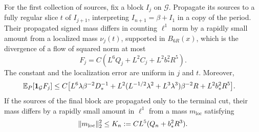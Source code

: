 \begin{lemma}\label{lem:blockflow}
For the first collection of sources, fix a block \(I_j\) on
\(\mathcal G\).  Propagate its sources to a fully regular slice \(t\)
of \(I_{j+1}\), interpreting \(I_{n+1}=\beta+I_1\) in a copy of the
period.  Their propagated signed mass differs in counting
\(\ell^1\) norm by a rapidly small amount from a localized mass
\(\nu_j(t)\), supported in \(B_{6R}(x)\), which is the divergence
of a flow of squared norm at most
\begin{equation}\label{eq:blockflowbound}
 F_j=C\left(L^6Q_j+L^2C_j+L^2b_*^2R^5\right).
\end{equation}
The constant and the localization error are uniform in \(j\) and
\(t\).  Moreover,
\begin{align}\label{eq:blockflowexpectation}
 \mathbb E_P[\mathbf 1_{\mathcal G}F_j]
 \le C\bigl[&L^6\lambda\beta^{-2}D_*^{-1}
 +L^2(L^{-1/2}\lambda^2+L^3\lambda^3)\beta^{-2}R
 +L^2b_*^2R^5\bigr].
\end{align}
If the sources of the final block are propagated only to the terminal
cut, their mass differs by a rapidly small amount in \(\ell^1\)
from a mass \(m_{\mathrm{loc}}\) satisfying
\begin{equation}\label{eq:lastblocknorm}
 \lVert m_{\mathrm{loc}}\rVert_2^2
 \le K_n:=CL^5(Q_n+b_*^2R^3).
\end{equation}
\end{lemma}

